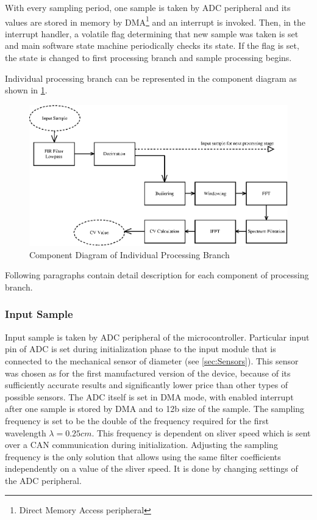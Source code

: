 \documentclass[twoside]{ctuthesis}
\theoremstyle{plain}
\theoremstyle{definition}
\theoremstyle{note}
\begin{document}
With every sampling period, one sample is taken by ADC peripheral and its values are stored in memory by DMA\footnote{Direct Memory Access peripheral} and an interrupt is invoked. Then, in the interrupt handler, a volatile flag determining that new sample was taken is set and main software state machine periodically checks its state. If the flag is set, the state is changed to first processing branch and sample processing begins.

Individual processing branch can be represented in the component diagram as shown in \ref{fig:singleBranch}.

\begin{figure}[h]
	\centering
	\includegraphics[width=1.0\textwidth]{sliver_singleBranch.eps}
	\caption{Component Diagram of Individual Processing Branch}
	\label{fig:singleBranch}
\end{figure}

Following paragraphs contain detail description for each component of processing branch.

\subsubsection{Input Sample}
Input sample is taken by ADC peripheral of the microcontroller. Particular input pin of ADC is set during initialization phase to the input module that is connected to the mechanical sensor of diameter (see \ref{sec:Sensors}). This sensor was chosen as for the first manufactured version of the device, because of its sufficiently accurate results and significantly lower price than other types of possible sensors. The ADC itself is set in DMA mode, with enabled interrupt after one sample is stored by DMA and to 12b size of the sample.
The sampling frequency is set to be the double of the frequency required for the first wavelength $\lambda=0.25 cm$. This frequency is dependent on sliver speed which is sent over a CAN communication during initialization. Adjusting the sampling frequency is the only solution that allows using the same filter coefficients independently on a value of the sliver speed. It is done by changing settings of the ADC peripheral.
\end{document}
